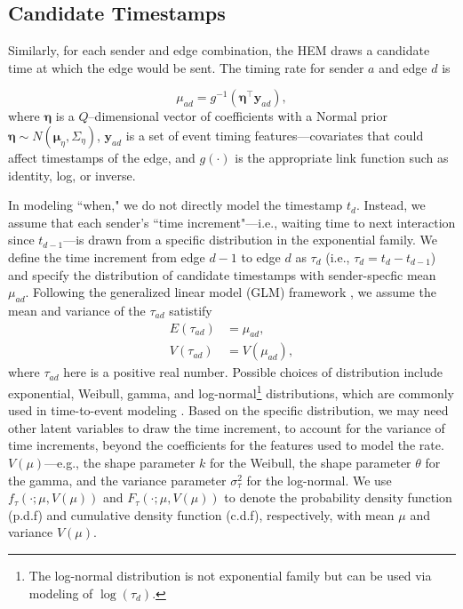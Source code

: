 \documentclass[ba]{imsart}
\numberwithin{equation}{section}
\theoremstyle{plain}
\begin{document}
\subsection{Candidate Timestamps}\label{subsec:Time}
Similarly, for each sender and edge combination, the HEM draws a candidate time at which the edge would be sent. The timing rate for sender $a$ and edge $d$ is

\begin{equation}
\mu_{ad} = g^{-1}(\boldsymbol{\eta}^\top \boldsymbol{y}_{ad}),
\end{equation}
where $\boldsymbol{\eta}$ is a $Q$--dimensional vector of coefficients with a Normal prior $\boldsymbol{\eta} \sim N(\boldsymbol{\mu}_\eta,\Sigma_\eta)$, $\boldsymbol{y}_{ad}$ is a set of event timing features---covariates that could affect timestamps of the edge, and $g(\cdot)$ is the appropriate link function such as identity, log, or inverse. 

In modeling ``when," we do not directly model the timestamp $t_d$. Instead, we assume that each sender's ``time increment"---i.e., waiting time to next interaction since $t_{d-1}$---is drawn from a specific distribution in the exponential family. We define the time increment from edge $d-1$ to edge $d$ as $\tau_{d}$ (i.e., $\tau_{d}= t_d-t_{d-1}$) and specify the distribution of candidate timestamps with sender-specfic mean $\mu_{ad}$. Following the generalized linear model (GLM) framework \citep{nelder1972generalized}, we assume the mean and variance of the $\tau_{ad}$ satistify
\begin{equation}
\begin{aligned}
E(\tau_{ad}) &= \mu_{ad},\\
V(\tau_{ad}) &= V(\mu_{ad}),
\end{aligned}
\end{equation}
where $\tau_{ad}$ here is a positive real number. Possible choices of distribution include exponential, Weibull, gamma, and log-normal\footnote{The log-normal distribution is not exponential family but can be used via modeling of $\log(\tau_d)$.} distributions, which are commonly used in time-to-event modeling \citep{rao2000applied,rizopoulos2012joint}. Based on the specific distribution, we may need other latent variables to draw the time increment, to account for the variance of time increments, beyond the coefficients for the features used to model the rate. $V(\mu)$---e.g., the shape parameter $k$ for the Weibull, the shape parameter $\theta$ for the gamma, and the variance parameter $\sigma_\tau^2$ for the log-normal. We use $f_\tau(\cdot; \mu, V(\mu))$ and $F_\tau(\cdot; \mu, V(\mu))$ to denote the probability density function (p.d.f) and cumulative density function (c.d.f), respectively, with mean $\mu$ and variance $V(\mu)$.
\end{document}
